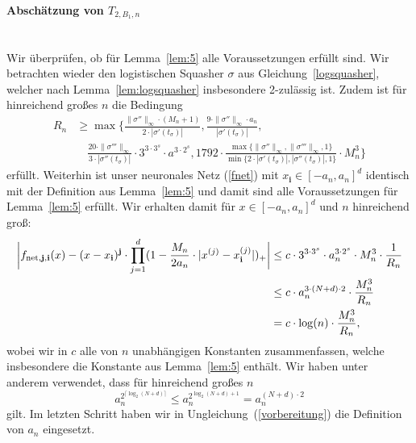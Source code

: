 {\paragraph*{Abschätzung von $T_{2,B_1,n}$}\mbox{}\\
Wir überprüfen, ob für Lemma~\ref{lem:5} alle Voraussetzungen erfüllt sind. Wir betrachten wieder den logistischen Squasher $\sigma$ aus Gleichung~\ref{logsquasher}, welcher nach Lemma~\ref{lem:logsquasher} insbesondere 2-zulässig ist. Zudem ist für hinreichend großes $n$ die Bedingung 
\begin{equation*}
\begin{split}
R_n & \geq \max\biggl\{\frac{\|\sigma''\|_{\infty} \cdot (M_n + 1)}{2 \cdot |\sigma'(t_{\sigma})|}, \frac{9 \cdot \|\sigma''\|_{\infty} \cdot a_n}{|\sigma'(t_{\sigma})|}, \\
& \quad \frac{20 \cdot \|\sigma'''\|_{\infty}}{3 \cdot |\sigma''(t_{\sigma})|} \cdot 3^{3 \cdot 3^s} \cdot a^{3 \cdot 2^s}, 1792 \cdot \frac{\max\{\|\sigma''\|_{\infty},\|\sigma'''\|_{\infty}, 1\}}{\min\{2 \cdot |\sigma'(t_{\sigma})|, |\sigma''(t_{\sigma})|, 1\}} \cdot M_n^3 \biggr\}
\end{split}
\end{equation*}
erfüllt. Weiterhin ist unser neuronales Netz (\ref{fnet}) mit $x_{\mathbf{i}} \in [-a_n, a_n]^d$ identisch mit der Definition aus Lemma~\ref{lem:5} und damit sind alle Voraussetzungen für Lemma~\ref{lem:5} erfüllt.
Wir erhalten damit für $x \in [-a_n ,a_n]^d$ und $n$ hinreichend groß:
\begin{equation}
\label{vorbereitung}
\begin{split}
\bigg| f_{\mathrm{net},\mathbf{j},\mathbf{i}}(x) - (x - x_{\mathbf{i}})^{\mathbf{j}} \cdot \prod_{j = 1}^d(1 - \frac{M_n}{2a_n} \cdot |x^{(j)} - x_{\mathbf{i}}^{(j)}|)_+ \bigg| & \leq c \cdot 3^{3 \cdot 3^s} \cdot a_n^{3 \cdot 2^s} \cdot M_n^3 \cdot \frac{1}{R_n} \\
& \leq c\cdot a_n^{3 \cdot (N + d) \cdot 2} \cdot \frac{M_n^3}{R_n} \\
& = c\cdot \log(n) \cdot \frac{M_n^3}{R_n},  
\end{split}
\end{equation}
wobei wir in $c$ alle von $n$ unabhängigen Konstanten zusammenfassen, welche insbesondere die Konstante aus Lemma~\ref{lem:5} enthält.
Wir haben unter anderem verwendet, dass für hinreichend großes $n$
$$a_n^{2^{\lceil\log_2(N + d)\rceil}} \leq a_n^{2^{\log_2(N + d) + 1}} = a_n^{(N + d) \cdot 2}$$ gilt. Im letzten Schritt haben wir in Ungleichung~(\ref{vorbereitung}) die Definition von $a_n$ eingesetzt. 
}
